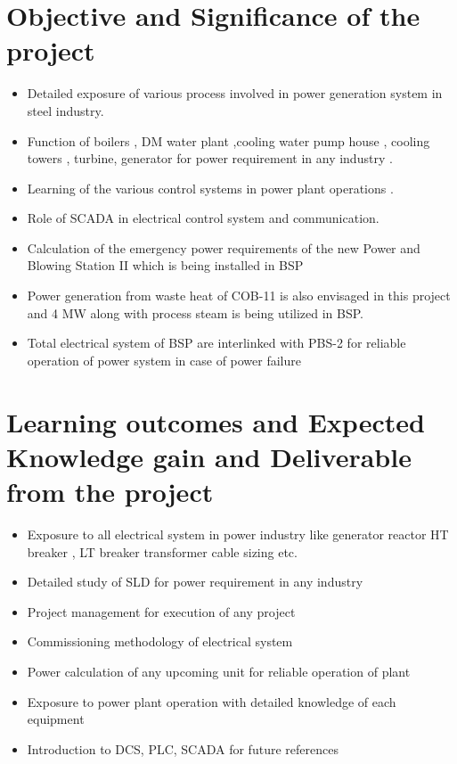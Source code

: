 \documentclass[english,11pt]{report}
\begin{document}
\section{Objective and Significance of the project}

\begin{itemize}
\item Detailed exposure of various process involved in power generation system in steel industry.
\item Function of boilers , DM water plant ,cooling water pump house , cooling towers , turbine, generator for power requirement in any industry .
\item Learning of the various control systems in power plant operations .
\item Role of SCADA  in electrical control system and communication.
\item Calculation of the emergency power requirements of the new Power and Blowing Station II which is being installed in BSP 
\item Power generation from waste heat of COB-11 is also envisaged in this project and 4 MW along with process steam is being utilized in BSP.
\item Total electrical system of BSP are interlinked with PBS-2 for reliable operation of power system in case of power failure
\end{itemize}

\pagebreak
\section{Learning outcomes and Expected Knowledge gain and Deliverable from the project}
\begin{itemize}
\item Exposure to all electrical system in power industry like generator reactor HT breaker  , LT breaker transformer  cable sizing etc. 
\item Detailed study of SLD for power requirement in any industry 
\item Project management for execution of any project 
\item Commissioning methodology of electrical system 
\item Power calculation of any upcoming unit for reliable operation of plant 
\item Exposure to power plant operation with detailed knowledge of each equipment
\item Introduction to DCS, PLC, SCADA for future references
\end{itemize}
\end{document}
